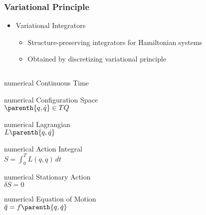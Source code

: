 \documentclass[11pt,professionalfonts]{beamer}
\begin{document}
\begin{frame} %
\frametitle{Variational Principle}
	\begin{itemize}
		\item Variational Integrators
			\begin{itemize}
				\item Structure-preserving integrators for Hamiltonian systems
				\item Obtained by discretizing variational principle
			\end{itemize}
	\end{itemize}
	\pause
	\begin{columns}[c]
		\begin{column}{0.5\textwidth}
			\centering
			\begin{beamercolorbox}[wd=0.8\columnwidth,sep=0.05cm,center]{numerical} Continuous Time \end{beamercolorbox}
			\begin{beamercolorbox}[wd=0.8\columnwidth,sep=0.05cm,center]{numerical} 
				Configuration Space \\
				\( \parenth{q, \dot{q} } \in TQ \)
			\end{beamercolorbox}
			\begin{beamercolorbox}[wd=0.8\columnwidth,sep=0.05cm,center]{numerical} 
				Lagrangian \\
				\( L\parenth{q, \dot{q} } \)
			\end{beamercolorbox}
			\begin{beamercolorbox}[wd=0.8\columnwidth,sep=0.05cm,center]{numerical} 
				Action Integral \\
				\( S = \int_{0}^T L\left( q, \dot{q}\right) \, dt \)
			\end{beamercolorbox}
			\begin{beamercolorbox}[wd=0.8\columnwidth,sep=0.05cm,center]{numerical} 
				Stationary Action \\
				\( \delta S = 0 \)
			\end{beamercolorbox}
			\begin{beamercolorbox}[wd=0.8\columnwidth,sep=0.05cm,center]{numerical} 
				Equation of Motion \\
				\( \ddot{q} = f \parenth{q, \dot{q} } \)

\end{beamercolorbox}
\end{column}
\end{columns}
\end{frame}
\end{document}
